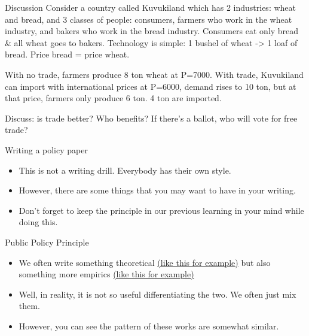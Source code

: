 \documentclass[
  ignorenonframetext,
]{beamer}
\begin{document}
\begin{frame}{Discussion}
\protect\hypertarget{discussion}{}
Consider a country called Kuvukiland which has 2 industries: wheat and
bread, and 3 classes of people: consumers, farmers who work in the wheat
industry, and bakers who work in the bread industry. Consumers eat only
bread \& all wheat goes to bakers. Technology is simple: 1 bushel of
wheat -\textgreater{} 1 loaf of bread. Price bread = price wheat.

With no trade, farmers produce 8 ton wheat at P=7000. With trade,
Kuvukiland can import with international prices at P=6000, demand rises
to 10 ton, but at that price, farmers only produce 6 ton. 4 ton are
imported.

Discuss: is trade better? Who benefits? If there's a ballot, who will
vote for free trade?
\end{frame}

\begin{frame}{Writing a policy paper}
\protect\hypertarget{writing-a-policy-paper}{}
\begin{itemize}
\item
  This is not a writing drill. Everybody has their own style.
\item
  However, there are some things that you may want to have in your
  writing.
\item
  Don't forget to keep the principle in our previous learning in your
  mind while doing this.
\end{itemize}
\end{frame}

\begin{frame}{Public Policy Principle}
\protect\hypertarget{public-policy-principle}{}
\begin{itemize}
\item
  We often write something theoretical
  \href{https://www.cips-indonesia.org/publications/the-advent-of-a-new-trade-governance-after-the-omnibus-law\%3A-neraca-komoditas}{(like
  this for example)} but also something more empirics
  \href{https://www.cips-indonesia.org/publications/technology-and-knowledge-transfers-to-dairy-farms\%3A-private-sector-contribution-to-improve-milk-production}{(like
  this for example)}
\item
  Well, in reality, it is not so useful differentiating the two. We
  often just mix them.
\item
  However, you can see the pattern of these works are somewhat similar.
\end{itemize}
\end{frame}
\end{document}
